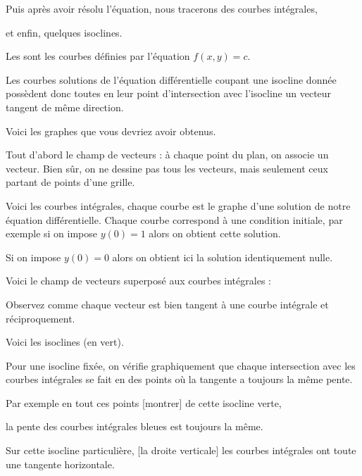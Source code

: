 Puis après avoir résolu l'équation, nous tracerons des courbes intégrales, 


et enfin, quelques isoclines.


\change
Les  sont les courbes 
définies par l'équation $f(x,y) = c$.

Les courbes solutions de l'équation différentielle coupant une isocline donnée possèdent donc toutes en leur point d'intersection avec l'isocline un vecteur tangent de même direction.

\diapo 

Voici les graphes que vous devriez avoir obtenus.

Tout d'abord le champ de vecteurs : à chaque point du plan, on associe un vecteur. Bien sûr, on ne dessine pas tous les vecteurs, mais seulement  ceux partant de points d'une grille.

\change
Voici les courbes intégrales, chaque courbe est le graphe d'une solution de notre équation différentielle. Chaque courbe correspond à une condition initiale, par exemple si on impose $y(0)=1$ alors on obtient cette solution.

Si on impose $y(0)=0$ alors on obtient ici la solution identiquement nulle.

\change
Voici le champ de vecteurs superposé aux courbes intégrales : 


Observez comme chaque vecteur est bien tangent à une courbe intégrale et réciproquement.

\change
Voici les isoclines (en vert). 

Pour une isocline fixée, on vérifie graphiquement que chaque intersection 
  avec les courbes intégrales se fait en des points où la tangente a toujours la même pente.
  
Par exemple en tout ces points [montrer] de cette isocline verte,

la pente des courbes intégrales bleues est toujours la même.

Sur cette isocline particulière, [la droite verticale] les courbes intégrales ont toute une tangente horizontale.


